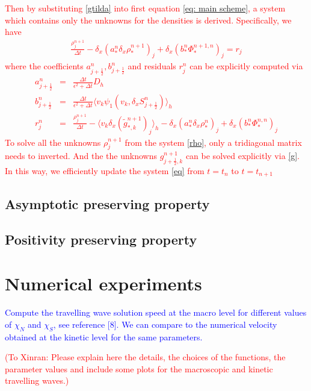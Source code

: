 \documentclass[11pt,twoside]{article}
\numberwithin{equation}{section}
\begin{document}
\textcolor{red}{
Then by substituting \ref{gtilda} into first equation \eqref{eq: main scheme}, a system which contains only the unknowns for the densities is derived. Specifically, we have  
\begin{eqnarray}\label{rho}
  \frac{\rho_j^{n+1}}{\Delta t}-\delta_x(a_*^n\delta_x\rho_*^{n+1})_j + \delta_x(b_*^n\Phi_*^{n+1,n})_j=r_j 
\end{eqnarray}
where the coefficients $a_{j+\frac{1}{2}}^n, b_{j+\frac{1}{2}}^n$ and residuals $r_j^n$ can be explicitly computed via
\begin{eqnarray}
    a_{j+\frac{1}{2}}^n&=&\frac{\Delta t}{\epsilon^2+\Delta t} D_h\nonumber\\
    b_{j+\frac{1}{2}}^n&=&\frac{\Delta t}{\epsilon^2+\Delta t} \langle v_k\psi_1(v_k,\delta_x S_{j+\frac{1}{2}}^n)\rangle_h\nonumber\\
    r_j^n&=&\frac{{\rho_j^{n+1}}}{\Delta t}-\langle v_k\delta_x(\tilde{g}_{*,k}^{n+1})_j\rangle_h-\delta_x(a_*^n\delta_x\rho_*^n)_j+\delta_x(b_*^n\Phi_*^{n,n})_j
    \end{eqnarray}
To solve all the unknowns $\rho_j^{n+1}$ from the system \eqref{rho}, only a tridiagonal matrix needs to inverted. And the the unknowns 
 $g_{j+\frac{1}{2},k}^{n+1}$ can be solved explicitly via \eqref{g}. In this way, we efficiently update the system \eqref{eq} from $t=t_n$ to $t=t_{n+1}$}



\subsection{Asymptotic preserving property}
\subsection{Positivity preserving property}
\section{Numerical experiments}
\textcolor{blue}{Compute the travelling wave solution speed at the macro level for different values of $\chi_N$ and $\chi_S$, see reference [8]. We can compare to the numerical velocity obtained at the kinetic level for the same parameters.}

\textcolor{red}{(To Xinran: Please explain here the details, the choices of the functions, the parameter values and include some plots for the macroscopic and kinetic travelling waves.)}
\end{document}
